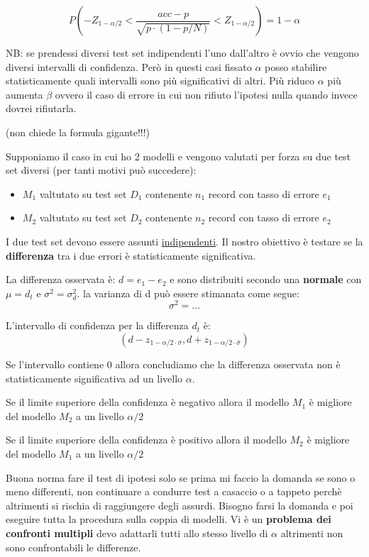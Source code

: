 \[ P(-Z_{1-\alpha/2} < \frac{acc - p}{\sqrt{p \cdot (1-p / N)}} < Z_{1 - \alpha/2}) = 1 - \alpha \]

NB: se prendessi diversi test set indipendenti l'uno dall'altro \`e ovvio che vengono diversi intervalli di confidenza. Per\`o in questi casi fissato $\alpha$ posso stabilire statisticamente quali intervalli sono pi\`u significativi di altri. Pi\`u riduco $\alpha$ pi\`u aumenta $\beta$ ovvero il caso di errore in cui non rifiuto l'ipotesi nulla quando invece dovrei rifiutarla.

(non chiede la formula gigante!!!)

Supponiamo il caso in cui ho 2 modelli e vengono valutati per forza su due test set diversi (per tanti motivi pu\`o succedere):
\begin{itemize}
	\item $M_1$ valtutato su test set $D_1$ contenente $n_1$ record con tasso di errore $e_1$
	\item $M_2$ valtutato su test set $D_2$ contenente $n_2$ record con tasso di errore $e_2$
\end{itemize}
I due test set devono essere assunti \underline{indipendenti}. Il nostro obiettivo \`e testare se la \textbf{differenza} tra i due errori \`e statisticamente significativa.

La differenza osservata \`e: $d = e_1 - e_2$ e sono distribuiti secondo una \textbf{normale} con $\mu = d_t$ e $\sigma^2 = \sigma^2_d$. la varianza di d pu\`o essere stimanata come segue: \[\sigma^2 = ... \]

L'intervallo di confidenza per la differenza $d_t$ \`e: \[ (d - z_{1-\alpha/2 \cdot \bar{\sigma}}, d + z_{1-\alpha/2 \cdot \bar{\sigma}}) \]

Se l'intervallo contiene 0 allora concludiamo che la differenza osservata non \`e statisticamente significativa ad un livello $\alpha$. 

Se il limite superiore della confidenza \`e negativo allora il modello $M_1$ \`e migliore del modello $M_2$ a un livello $\alpha/2$

Se il limite superiore della confidenza \`e positivo allora il modello $M_2$ \`e migliore del modello $M_1$ a un livello $\alpha/2$

Buona norma fare il test di ipotesi solo se prima mi faccio la domanda se sono o meno differenti, non continuare a condurre test a casaccio o a tappeto perch\`e altrimenti si rischia di raggiungere degli assurdi. Bisogno farsi la domanda e poi eseguire tutta la procedura sulla coppia di modelli. Vi \`e un \textbf{problema dei confronti multipli} devo adattarli tutti allo stesso livello di $\alpha$ altrimenti non sono confrontabili le differenze. 

